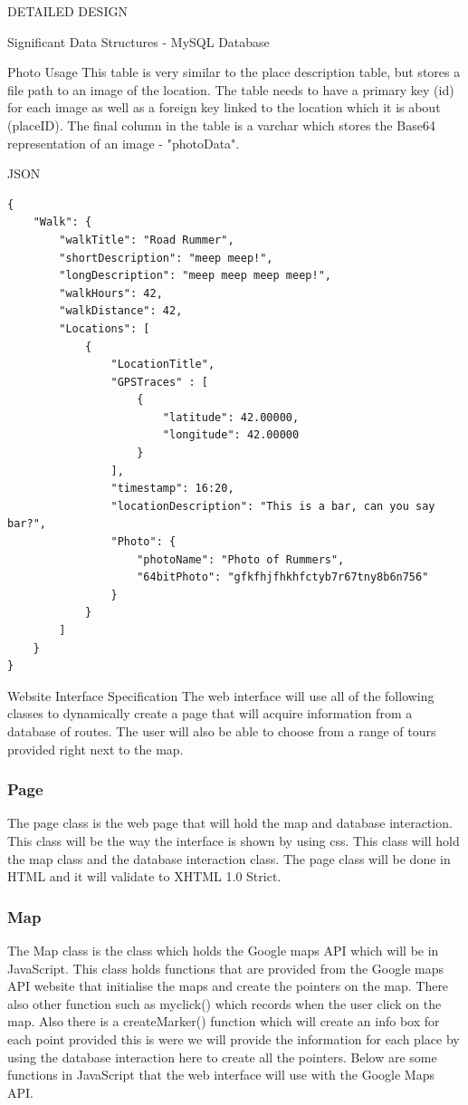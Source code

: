\documentclass{article}
\begin{document}
\begin{section}{DETAILED DESIGN}
\begin{subsection}{Significant Data Structures - MySQL Database}
		\begin{subsubsection}{Photo Usage}
			This table is very similar to the place description table, but stores a file path to an image of the location. The table needs to have a primary key (id) for each image as well as a foreign key linked to the location which it is about (placeID). The final column in the table is a varchar which stores the Base64 representation of an image - "photoData".
		\end{subsubsection}

		\clearpage
		\begin{subsubsection}{JSON}
			\begin{lstlisting}
{
	"Walk": {
		"walkTitle": "Road Rummer",
		"shortDescription": "meep meep!",
		"longDescription": "meep meep meep meep!",
		"walkHours": 42,
		"walkDistance": 42,
		"Locations": [
			{
				"LocationTitle",
				"GPSTraces" : [
					{
						"latitude": 42.00000,
						"longitude": 42.00000
					}
				],
				"timestamp": 16:20,
				"locationDescription": "This is a bar, can you say bar?",
				"Photo": {
					"photoName": "Photo of Rummers",	
					"64bitPhoto": "gfkfhjfhkhfctyb7r67tny8b6n756"
				}
			}
		]
	}
}
			\end{lstlisting}
		\end{subsubsection}
	\end{subsection}
	
	\begin{subsection}{Website Interface Specification}
		The web interface will use all of the following classes to dynamically create a page that will acquire information from a database of routes. The user will also be able to choose from a range of tours provided right next to the map. 

		\subsubsection{Page}
			The page class is the web page that will hold the map and database interaction. This class will be the way the interface is shown by using css. This class will hold the map class and the database interaction class. The page class will be done in HTML and it will validate to XHTML 1.0 Strict. 

		\subsubsection{Map}
			The Map class is the class which holds the Google maps API which will be in JavaScript. This class holds functions that are provided from the Google maps API website that initialise the maps and create the pointers on the map. There also other function such as myclick() which records when the user click on the map. Also there is a createMarker() function which will create an info box for each point provided this is were we will provide the information for each place by using the database interaction here to create all the pointers. Below are some functions in JavaScript that the web interface will use with the Google Maps API.


\end{subsection}
\end{section}
\end{document}
